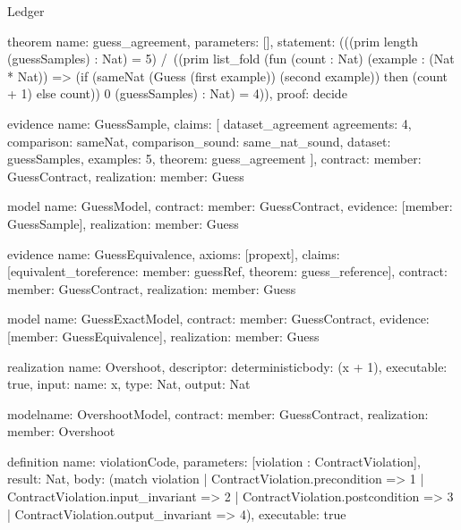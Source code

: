 \begin{lexlean}{Ledger}
\begin{semanticmodule}
theorem{
  name: guess_agreement,
  parameters: [],
  statement: (((prim length (guessSamples) : Nat) = 5) /\ ((prim list_fold (fun (count : Nat) (example : (Nat * Nat)) => (if (sameNat (Guess (first example)) (second example)) then (count + 1) else count)) 0 (guessSamples) : Nat) = 4)),
  proof: decide{}
}

evidence{
  name: GuessSample,
  claims: [
    dataset_agreement{
      agreements: 4,
      comparison: sameNat,
      comparison_sound: same_nat_sound,
      dataset: guessSamples,
      examples: 5,
      theorem: guess_agreement
    }
  ],
  contract: {member: GuessContract},
  realization: {member: Guess}
}

model{
  name: GuessModel,
  contract: {member: GuessContract},
  evidence: [{member: GuessSample}],
  realization: {member: Guess}
}

evidence{
  name: GuessEquivalence,
  axioms: [propext],
  claims: [equivalent_to{reference: {member: guessRef}, theorem: guess_reference}],
  contract: {member: GuessContract},
  realization: {member: Guess}
}

model{
  name: GuessExactModel,
  contract: {member: GuessContract},
  evidence: [{member: GuessEquivalence}],
  realization: {member: Guess}
}

realization{
  name: Overshoot,
  descriptor: deterministic{body: (x + 1)},
  executable: true,
  input: {name: x, type: Nat},
  output: Nat
}

model{name: OvershootModel, contract: {member: GuessContract}, realization: {member: Overshoot}}

definition{
  name: violationCode,
  parameters: [violation : ContractViolation],
  result: Nat,
  body: (match violation
    | ContractViolation.precondition => 1
    | ContractViolation.input_invariant => 2
    | ContractViolation.postcondition => 3
    | ContractViolation.output_invariant => 4),
  executable: true
}
\end{semanticmodule}
\end{lexlean}
